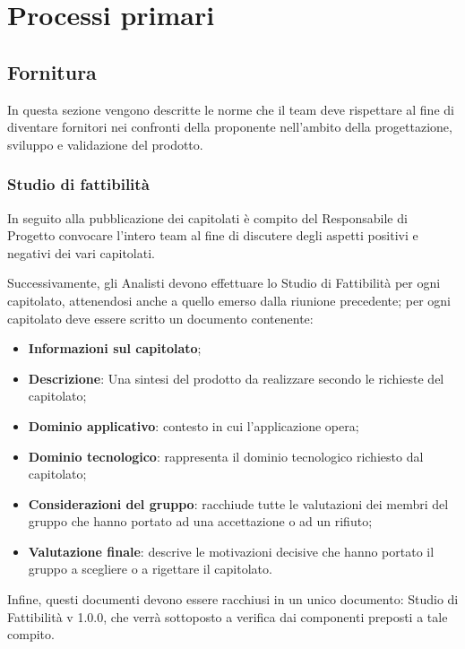 \section{Processi primari}
\subsection{Fornitura}
In questa sezione vengono descritte le norme che il team deve rispettare al fine di diventare fornitori nei confronti della proponente nell'ambito della progettazione, sviluppo e validazione del prodotto.
\subsubsection{Studio di fattibilità}
In seguito alla pubblicazione dei capitolati è compito del Responsabile di Progetto convocare l'intero team al fine di discutere degli aspetti positivi e negativi dei vari capitolati.

Successivamente, gli Analisti devono effettuare lo Studio di Fattibilità per ogni capitolato, attenendosi anche a quello emerso dalla riunione precedente; per ogni capitolato deve essere scritto un documento contenente:
\begin{itemize}
\item \textbf{Informazioni sul capitolato};
\item \textbf{Descrizione}: Una sintesi del prodotto da realizzare secondo le richieste del capitolato;
\item \textbf{Dominio applicativo}: contesto in cui l'applicazione opera;
\item \textbf{Dominio tecnologico}: rappresenta il dominio tecnologico richiesto dal capitolato;
\item \textbf{Considerazioni del gruppo}: racchiude tutte le valutazioni dei membri del gruppo che hanno portato ad una accettazione o ad un rifiuto;
\item \textbf{Valutazione finale}: descrive le motivazioni decisive che hanno portato il gruppo a scegliere o a rigettare il capitolato.
\end{itemize}


Infine, questi documenti devono essere racchiusi in un unico documento: Studio di Fattibilità v 1.0.0, che verrà sottoposto a verifica dai componenti preposti a tale compito.

